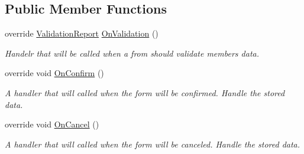 \subsection*{Public Member Functions}
\begin{DoxyCompactItemize}
\item 
override \mbox{\hyperlink{struct_wpf_handler_1_1_u_i_1_1_auto_layout_1_1_form_descriptor_1_1_validation_report}{Validation\+Report}} \mbox{\hyperlink{class_wpf_handler_1_1_u_i_1_1_controls_1_1_logon_1_1_default_registration_panel_descriptor_abc8055d00358a941e9b507fed58ff662}{On\+Validation}} ()
\begin{DoxyCompactList}\small\item\em Handelr that will be called when a from should validate members data. \end{DoxyCompactList}\item 
override void \mbox{\hyperlink{class_wpf_handler_1_1_u_i_1_1_controls_1_1_logon_1_1_default_registration_panel_descriptor_aee1e6b6ba9214aac4a82b0213e4d3442}{On\+Confirm}} ()
\begin{DoxyCompactList}\small\item\em A handler that will called when the form will be confirmed. Handle the stored data. \end{DoxyCompactList}\item 
override void \mbox{\hyperlink{class_wpf_handler_1_1_u_i_1_1_controls_1_1_logon_1_1_default_registration_panel_descriptor_a9154a1e27afdf8d40da139042ee7e609}{On\+Cancel}} ()
\begin{DoxyCompactList}\small\item\em A handler that will called when the form will be canceled. Handle the stored data. \end{DoxyCompactList}\end{DoxyCompactItemize}
